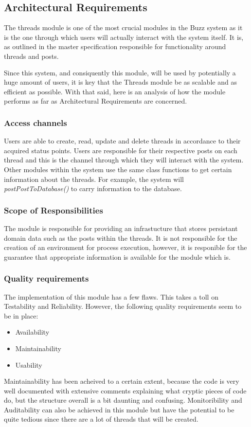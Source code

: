 \subsection{Architectural Requirements}
\begin{flushleft}

The threads module is one of the most crucial modules in the Buzz system as it is the one through which users will actually interact with the system itself. It is, as outlined in the master specification responsible for functionality around threads and posts. 

Since this system, and consiquently this module, will be used by potentially a huge amount of users, it is key that the Threads module be as scalable and as efficient as possible. With that said, here is an analysis of how the module performs as far as Architectural Requirements are concerned.


\subsubsection{Access channels}
Users are able to create, read, update and delete threads in accordance to their acquired status points. Users are responsible for their respective posts on each thread and this is the channel through which they will interact with the system. Other modules within  the system use the same class functions to get certain information about the threads. For example, the system will \emph{postPostToDatabase()} to carry information to the database.

\subsubsection{Scope of Responsibilities}
The module is responsible for providing an infrastucture that stores persistant domain data such as the posts within the threads. It is not responsible for the creation of an environment for process execution, however, it is responible for the guarantee that appropriate information is available for the module which is.

\subsubsection{Quality requirements}
The implementation of this module has a few flaws. This takes a toll on Testability and Reliability. However, the following quality requirements seem to be in place:
\begin{itemize}
\item Availability
\item Maintainability
\item Usability
\end{itemize}
Maintainability has been acheived to a certain extent, because the code is very well documented with extensive comments explaining what cryptic pieces of code do, but the structure overall is a bit daunting and confusing. Monitoribility and Auditability can also be achieved in this module but have the potential to be quite tedious since there are a lot of threads that will be created.


\end{flushleft}
